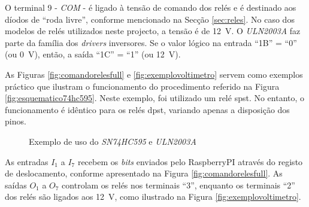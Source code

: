 O terminal 9 - \textit{COM} - é ligado à tensão de comando dos relés e é destinado aos díodos de ``roda livre'', conforme mencionado na Secção \ref{sec:reles}. No caso dos modelos de relés utilizados neste projecto, a tensão é de \SI{12}{\volt}.
O \textit{ULN2003A} faz parte da família dos \textit{drivers} inversores. Se o valor lógico na entrada ``1B'' = ``0'' (ou \SI{0}{\volt}), então, a saída ``1C'' = ``1'' (ou \SI{12}{\volt}).

As Figuras \ref{fig:comandorelesfull} e \ref{fig:exemplovoltimetro} servem como exemplos práctico que ilustram o funcionamento do procedimento referido na Figura \ref{fig:esquematico74hc595}. Neste exemplo, foi utilizado um relé \acrshort{spst}. No entanto, o funcionamento é idêntico para os relés \acrshort{dpst}, variando apenas a disposição dos pinos.

\begin{figure}[hbtp]
	\centering%
		\centering
		\qquad
		\caption{Exemplo de uso do \textit{SN74HC595} e \textit{ULN2003A}}%
		\label{fig:ligacao5952003}%
	\end{figure}

As entradas $I_{1}$ a $I_{7}$ recebem os \textit{bits} enviados pelo \gls{RaspberryPI} através do registo de deslocamento, conforme apresentado na Figura \ref{fig:comandorelesfull}. As saídas $O_{1}$ a $O_{7}$ controlam os relés nos terminais ``3'', enquanto os terminais ``2'' dos relés são ligados aos \SI{12}{\volt}, como ilustrado na Figura \ref{fig:exemplovoltimetro}.

